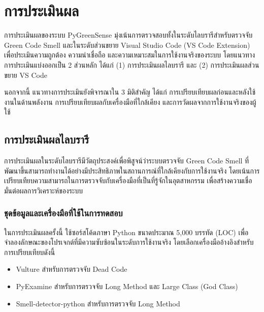 \chapter{การประเมินผล}
\label{Ch:Evaluation}

การประเมินผลของระบบ {\italicfont PyGreenSense} มุ่งเน้นการตรวจสอบทั้งในระดับไลบรารีสำหรับตรวจจับ {\italicfont Green Code Smell} และในระดับส่วนขยาย {\italicfont Visual Studio Code (VS Code Extension)} เพื่อประเมินความถูกต้อง ความน่าเชื่อถือ และความเหมาะสมในการใช้งานจริงของระบบ โดยแนวทางการประเมินแบ่งออกเป็น 2 ส่วนหลัก ได้แก่ (1) การประเมินผลไลบรารี และ (2) การประเมินผลส่วนขยาย VS Code

นอกจากนี้ แนวทางการประเมินยังพิจารณาใน 3 มิติสำคัญ ได้แก่ การเปรียบเทียบผลก่อนและหลังใช้งานในด้านพลังงาน การเปรียบเทียบผลกับเครื่องมือที่ใกล้เคียง และการวัดผลจากการใช้งานจริงของผู้ใช้


\section{การประเมินผลไลบรารี}

การประเมินผลในระดับไลบรารีมีวัตถุประสงค์เพื่อพิสูจน์ว่าระบบตรวจจับ {\italicfont Green Code Smell} ที่พัฒนาขึ้นสามารถทำงานได้อย่างมีประสิทธิภาพในสถานการณ์ที่ใกล้เคียงกับการใช้งานจริง โดยเน้นการเปรียบเทียบความสามารถในการตรวจจับกับเครื่องมือที่เป็นที่รู้จักในอุตสาหกรรม เพื่อสร้างความเชื่อมั่นต่อผลการวิเคราะห์ของระบบ

\subsection{ชุดข้อมูลและเครื่องมือที่ใช้ในการทดสอบ}

ในการประเมินผลครั้งนี้ ใช้ซอร์สโค้ดภาษา Python ขนาดประมาณ 5{,}000 บรรทัด (LOC) เพื่อจำลองลักษณะของโปรเจกต์ที่มีความซับซ้อนในระดับการใช้งานจริง โดยเลือกเครื่องมืออ้างอิงสำหรับการเปรียบเทียบดังนี้

\begin{itemize}
    \item {\boldfont Vulture} สำหรับการตรวจจับ {\italicfont Dead Code}
    \item {\boldfont PyExamine} สำหรับการตรวจจับ {\italicfont Long Method} และ {\italicfont Large Class (God Class)}
    \item {\boldfont Smell-detector-python} สำหรับการตรวจจับ {\italicfont Long Method}
\end{itemize}

